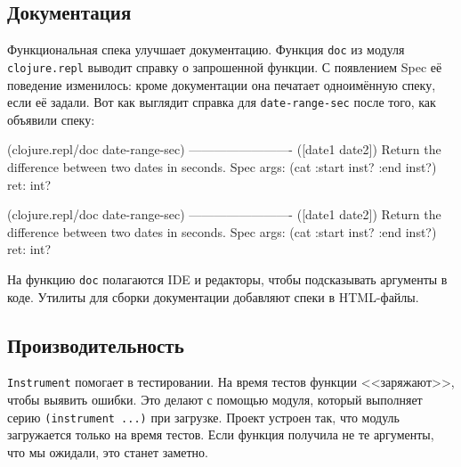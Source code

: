 \subsection{Документация}


Функциональная спека улучшает документацию. Функция \verb|doc| из модуля
\verb|clojure.repl| выводит справку о запрошенной функции. С появлением Spec её
поведение изменилось: кроме документации она печатает одноимённую спеку, если её
задали. Вот как выглядит справка для \verb|date-range-sec| после того, как
объявили спеку:

\ifx\DEVICETYPE\MOBILE

\begin{english}
  \begin{clojure}
(clojure.repl/doc date-range-sec)
-------------------------
([date1 date2])
  Return the difference
            between two dates in seconds.
Spec
  args: (cat :start inst? :end inst?)
  ret: int?
  \end{clojure}
\end{english}

\else

\begin{english}
  \begin{clojure}
(clojure.repl/doc date-range-sec)
-------------------------
([date1 date2])
  Return the difference between two dates in seconds.
Spec
  args: (cat :start inst? :end inst?)
  ret: int?
  \end{clojure}
\end{english}

\fi

На функцию \verb|doc| полагаются IDE и редакторы, чтобы подсказывать аргументы в
коде. Утилиты для сборки документации добавляют спеки в HTML-файлы.

\subsection{Производительность}


\verb|Instrument| помогает в тестировании. На время тестов функции <<заряжают>>,
чтобы выявить ошибки. Это делают с помощью модуля, который выполняет серию
\verb|(instrument ...)| при загрузке. Проект устроен так, что модуль загружается
только на время тестов. Если функция получила не те аргументы, что мы ожидали,
это станет заметно.

